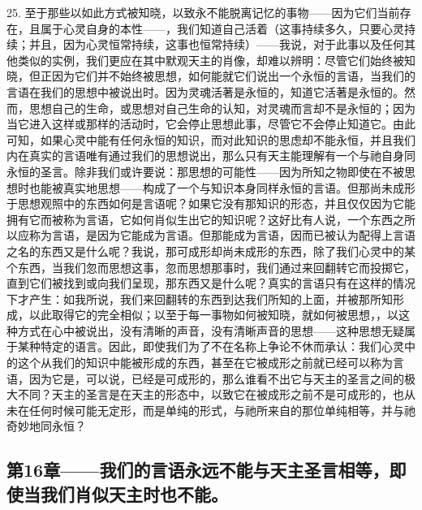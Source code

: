 25. 至于那些以如此方式被知晓，以致永不能脱离记忆的事物——因为它们当前存在，且属于心灵自身的本性——，我们知道自己活着（这事持续多久，只要心灵持续；并且，因为心灵恒常持续，这事也恒常持续）——我说，对于此事以及任何其他类似的实例，我们更应在其中默观天主的肖像，却难以辨明：尽管它们始终被知晓，但正因为它们并不始终被思想，如何能就它们说出一个永恒的言语，当我们的言语在我们的思想中被说出时。\newline{}因为灵魂活著是永恒的，知道它活著是永恒的。\newline{}然而，思想自己的生命，或思想对自己生命的认知，对灵魂而言却不是永恒的；因为当它进入这样或那样的活动时，它会停止思想此事，尽管它不会停止知道它。\newline{}由此可知，如果心灵中能有任何永恒的知识，而对此知识的思虑却不能永恒，并且我们内在真实的言语唯有通过我们的思想说出，那么只有天主能理解有一个与祂自身同永恒的圣言。\newline{}除非我们或许要说：那思想的可能性——因为所知之物即使在不被思想时也能被真实地思想——构成了一个与知识本身同样永恒的言语。\newline{}但那尚未成形于思想观照中的东西如何是言语呢？如果它没有那知识的形态，并且仅仅因为它能拥有它而被称为言语，它如何肖似生出它的知识呢？这好比有人说，一个东西之所以应称为言语，是因为它能成为言语。但那能成为言语，因而已被认为配得上言语之名的东西又是什么呢？我说，那可成形却尚未成形的东西，除了我们心灵中的某个东西，当我们忽而思想这事，忽而思想那事时，我们通过来回翻转它而投掷它，直到它们被找到或向我们呈现，那东西又是什么呢？真实的言语只有在这样的情况下才产生：如我所说，我们来回翻转的东西到达我们所知的上面，并被那所知形成，以此取得它的完全相似；以至于每一事物如何被知晓，就如何被思想，，以这种方式在心中被说出，没有清晰的声音，没有清晰声音的思想——这种思想无疑属于某种特定的语言。因此，即使我们为了不在名称上争论不休而承认：我们心灵中的这个从我们的知识中能被形成的东西，甚至在它被成形之前就已经可以称为言语，因为它是，可以说，已经是可成形的，那么谁看不出它与天主的圣言之间的极大不同？天主的圣言是在天主的形态中，以致它在被成形之前不是可成形的，也从未在任何时候可能无定形，而是单纯的形式，与祂所来自的那位单纯相等，并与祂奇妙地同永恒？\par


\subsection{第16章——我们的言语永远不能与天主圣言相等，即使当我们肖似天主时也不能。}

